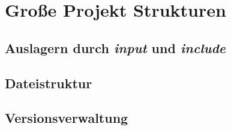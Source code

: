 \section{Große Projekt Strukturen}

\subsection{Auslagern durch \textit{input} und \textit{include}}

\subsection{Dateistruktur}

\subsection{Versionsverwaltung}